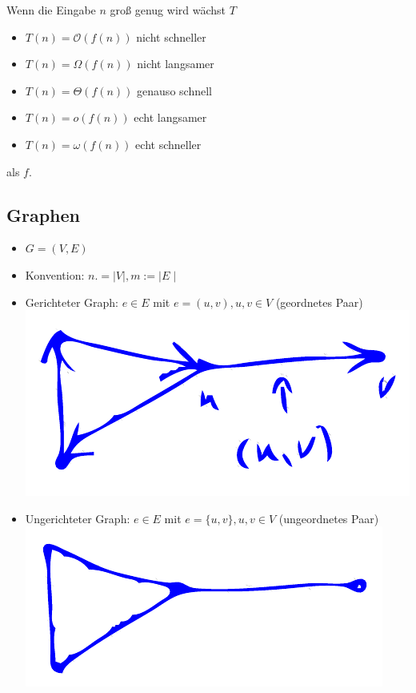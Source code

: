 \documentclass{scrartcl}
\begin{document}
Wenn die Eingabe $ n $ groß genug wird wächst $ T $
\begin{itemize}
	\item $ T(n) = \mathcal{O}(f(n)) $ \hfill nicht schneller
	\item $ T(n) = \Omega(f(n)) $ \hfill nicht langsamer
	\item $ T(n) = \Theta(f(n)) $ \hfill genauso schnell
	\item $ T(n) = o(f(n)) $ \hfill echt langsamer
	\item $ T(n) = \omega(f(n)) $ \hfill echt schneller
\end{itemize}
als $ f $.

\subsection{Graphen}

\begin{itemize}
	\item $ G = (V,E) $
	\item Konvention: $ n .= \mid V \mid, m:= \mid E \mid $
	\item Gerichteter Graph: $ e \in E $ mit $ e = (u,v), u, v \in V $ (geordnetes Paar) \\
	\includegraphics[width=\linewidth]{figures/gerichteter-graph.pdf}
	\item Ungerichteter Graph: $ e \in E $ mit $ e = \{ u,v \}, u, v \in V $ (ungeordnetes Paar) \\
	\includegraphics[width=\linewidth]{figures/ungerichteter-graph.pdf}
\end{itemize}
\end{document}
